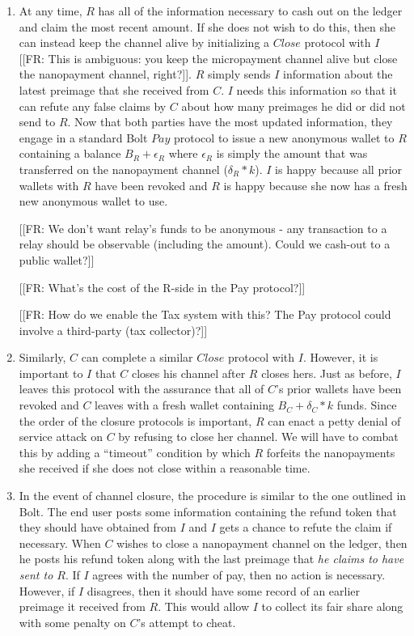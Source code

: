 \documentclass{article}
\newcommand{\flo}[1]{ {\color{blue} [[FR: #1]]}}
\begin{document}
\begin{enumerate}
\item At any time, $R$ has all of the information necessary to cash out on the ledger and claim the most recent amount. If she does not wish to do this, then she can instead keep the channel alive by initializing a $Close$ protocol with $I$ \flo{This is ambiguous: you keep the micropayment channel alive but close the nanopayment channel, right?}. $R$ simply sends $I$ information about the latest preimage that she received from $C$. $I$ needs this information so that it can refute any false claims by $C$ about how many preimages he did or did not send to $R$. Now that both parties have the most updated information, they engage in a standard Bolt $Pay$ protocol to issue a new anonymous wallet to $R$ containing a balance $B_R + \epsilon_R$ where $\epsilon_R$ is simply the amount that was transferred on the nanopayment channel ($\delta_R * k$). $I$ is happy because all prior wallets with $R$ have been revoked and $R$ is happy because she now has a fresh new anonymous wallet to use.

\flo{We don't want relay's funds to be anonymous - any transaction to a relay should be observable (including the amount). Could we cash-out to a public wallet?}

\flo{What's the cost of the R-side in the Pay protocol?}

\flo{How do we enable the Tax system with this? The Pay protocol could involve a third-party (tax collector)?}

\item Similarly, $C$ can complete a similar $Close$ protocol with $I$. However, it is important to $I$ that $C$ closes his channel after $R$ closes hers. Just as before, $I$ leaves this protocol with the assurance that all of $C$'s prior wallets have been revoked and $C$ leaves with a fresh wallet containing $B_C + \delta_C * k$ funds. Since the order of the closure protocols is important, $R$ can enact a petty denial of service attack on $C$ by refusing to close her channel. We will have to combat this by adding a ``timeout'' condition by which $R$ forfeits the nanopayments she received if she does not close within a reasonable time.

\item In the event of channel closure, the procedure is similar to the one outlined in Bolt. The end user posts some information containing the refund token that they should have obtained from $I$ and $I$ gets a chance to refute the claim if necessary. When $C$ wishes to close a nanopayment channel on the ledger, then he posts his refund token along with the last preimage that \emph{he claims to have sent to $R$}. If $I$ agrees with the number of pay, then no action is necessary. However, if $I$ disagrees, then it should have some record of an earlier preimage it received from $R$. This would allow $I$ to collect its fair share along with some penalty on $C$'s attempt to cheat.
\end{enumerate}
\end{document}
